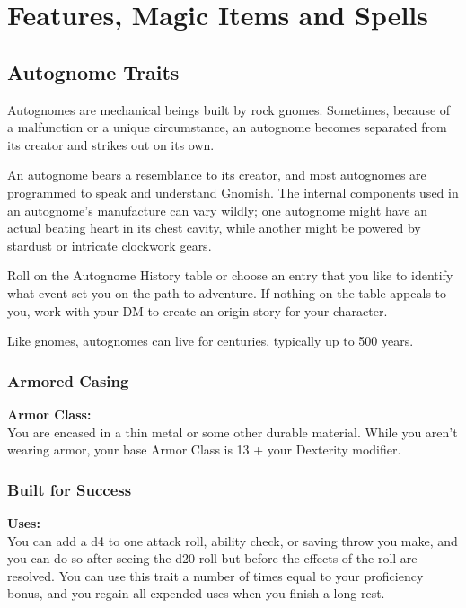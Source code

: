 \documentclass[letterpaper,openany,oneside,twocolumn]{book}
\begin{document}
\onecolumn


\rendercharactersheet

\renderbackgroundsheet

\renderspellsheet


\restoregeometry
\twocolumn

\chapter*{Features, Magic Items and Spells}

\section*{Autognome Traits}
Autognomes are mechanical beings built by rock gnomes. Sometimes, because of a malfunction or a unique circumstance, an autognome becomes separated from its creator and strikes out on its own.

An autognome bears a resemblance to its creator, and most autognomes are programmed to speak and understand Gnomish. The internal components used in an autognome's manufacture can vary wildly; one autognome might have an actual beating heart in its chest cavity, while another might be powered by stardust or intricate clockwork gears.

Roll on the Autognome History table or choose an entry that you like to identify what event set you on the path to adventure. If nothing on the table appeals to you, work with your DM to create an origin story for your character.

Like gnomes, autognomes can live for centuries, typically up to 500 years.
\subsection*{Armored Casing}
\textbf{Armor Class: }\\
You are encased in a thin metal or some other durable material. While you aren't wearing armor, your base Armor Class is 13 + your Dexterity modifier.
\subsection*{Built for Success}
\textbf{Uses: }\\
You can add a d4 to one attack roll, ability check, or saving throw you make, and you can do so after seeing the d20 roll but before the effects of the roll are resolved. You can use this trait a number of times equal to your proficiency bonus, and you regain all expended uses when you finish a long rest.
\end{document}
